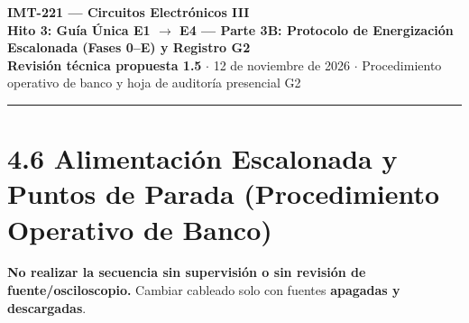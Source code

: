 \documentclass[10pt, a4paper, landscape]{article}
\begin{document}
\noindent
{\LARGE \textbf{\textcolor{ucbblue}{IMT-221 — Circuitos Electrónicos III}}}\\[0.12cm]
{\Large \textbf{Hito 3: Guía Única E1 $\rightarrow$ E4 — Parte 3B: Protocolo de Energización Escalonada (Fases 0--E) y Registro G2}}\\[0.08cm]
{\small \textbf{Revisión técnica propuesta 1.5} $\cdot$ 12 de noviembre de 2026 $\cdot$ Procedimiento operativo de banco y hoja de auditoría presencial G2}
\par\vspace{0.15cm}\noindent\rule{\linewidth}{0.4pt}\vspace{0.2cm}

\section*{4.6 Alimentación Escalonada y Puntos de Parada (Procedimiento Operativo de Banco)}
\textbf{\textcolor{warnred}{No realizar la secuencia sin supervisión o sin revisión de fuente/osciloscopio.}} Cambiar cableado solo con fuentes \textbf{apagadas y descargadas}.
\end{document}
